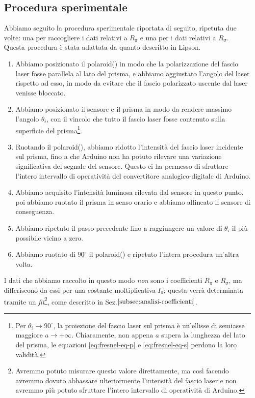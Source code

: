 \subsection{Procedura sperimentale}\label{subsec:procedura-sperimentale}
  Abbiamo seguito la procedura sperimentale riportata di seguito, ripetuta due
  volte: una per raccogliere i dati relativi a $R_\pi$ e una per i dati relativi
  a $R_\sigma$. Questa procedura è stata adattata da quanto descritto in Lipson\cite{lipson20}.
  \begin{enumerate}
    \item%
      Abbiamo posizionato il polaroid() in modo che la polarizzazione del
      fascio laser fosse parallela al lato del prisma, e abbiamo aggiustato l'angolo
      del laser rispetto ad esso, in modo da evitare che il fascio
      polarizzato uscente dal laser venisse bloccato.
    \item%
      Abbiamo posizionato il sensore e il prisma in modo da rendere
      massimo l'angolo $\theta_i$, con il vincolo che
      tutto il fascio laser fosse contenuto sulla superficie del prisma\footnote{Per $\theta_i \to 90^\circ$, la
      proiezione del fascio laser sul prisma è un'ellisse di semiasse maggiore $a \to +\infty$. Chiaramente, non appena
      $a$ supera la lunghezza del lato del prisma, le equazioni \eqref{eq:fresnel-eq-p} e \eqref{eq:fresnel-eq-s} perdono
      la loro validità.}.
    \item%
      Ruotando il polaroid(), abbiamo ridotto l’intensità del fascio laser
      incidente sul prisma, fino a che Arduino non ha potuto rilevare una
      variazione significativa del segnale del sensore.
      Questo ci ha permesso di sfruttare l'intero intervallo di operatività del convertitore analogico-digitale di Arduino.
    \item%
      Abbiamo acquisito l'intensità luminosa rilevata dal sensore in questo punto,
      poi abbiamo ruotato il prisma in senso orario e abbiamo
      allineato il sensore di conseguenza.
    \item%
      Abbiamo ripetuto il passo precedente fino a raggiungere un valore di $\theta_i$
      il più possibile vicino a zero.
    \item%
      Abbiamo ruotato di $90^\circ$ il polaroid() e ripetuto l'intera
      procedura un'altra volta.
  \end{enumerate}
  I dati che abbiamo raccolto in questo modo \emph{non} sono
  i coefficienti $R_\pi$ e $R_\sigma$, ma differiscono da essi per una costante
  moltiplicativa $I_0$; questa verrà determinata tramite un \emph{fit}\footnote{Avremmo potuto misurare
  questo valore direttamente, ma così facendo avremmo dovuto
  abbassare ulteriormente l'intensità del fascio laser e non avremmo più potuto
  sfruttare l'intero intervallo di operatività di Arduino.}, come descritto in Sez.$\ref{subsec:analisi-coefficienti}$.
\endinput

